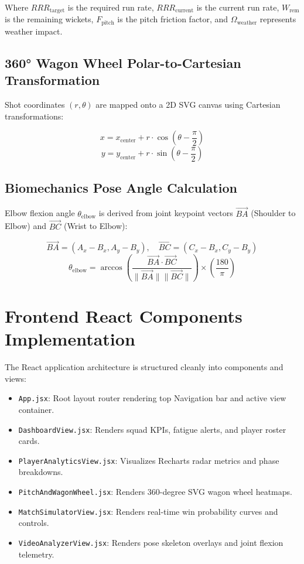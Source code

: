 \documentclass[12pt,a4paper]{report}
\begin{document}
Where $RRR_{\text{target}}$ is the required run rate, $RRR_{\text{current}}$ is the current run rate, $W_{\text{rem}}$ is the remaining wickets, $F_{\text{pitch}}$ is the pitch friction factor, and $\Omega_{\text{weather}}$ represents weather impact.

\subsection{360° Wagon Wheel Polar-to-Cartesian Transformation}
Shot coordinates $(r, \theta)$ are mapped onto a 2D SVG canvas using Cartesian transformations:

\begin{equation}
x = x_{\text{center}} + r \cdot \cos\left(\theta - \frac{\pi}{2}\right)
\end{equation}
\begin{equation}
y = y_{\text{center}} + r \cdot \sin\left(\theta - \frac{\pi}{2}\right)
\end{equation}

\subsection{Biomechanics Pose Angle Calculation}
Elbow flexion angle $\theta_{\text{elbow}}$ is derived from joint keypoint vectors $\vec{BA}$ (Shoulder to Elbow) and $\vec{BC}$ (Wrist to Elbow):

\begin{equation}
\vec{BA} = (A_x - B_x, A_y - B_y), \quad \vec{BC} = (C_x - B_x, C_y - B_y)
\end{equation}
\begin{equation}
\theta_{\text{elbow}} = \arccos\left( \frac{\vec{BA} \cdot \vec{BC}}{\|\vec{BA}\| \|\vec{BC}\|} \right) \times \left(\frac{180}{\pi}\right)
\end{equation}

\section{Frontend React Components Implementation}
The React application architecture is structured cleanly into components and views:
\begin{itemize}
    \item \texttt{App.jsx}: Root layout router rendering top Navigation bar and active view container.
    \item \texttt{DashboardView.jsx}: Renders squad KPIs, fatigue alerts, and player roster cards.
    \item \texttt{PlayerAnalyticsView.jsx}: Visualizes Recharts radar metrics and phase breakdowns.
    \item \texttt{PitchAndWagonWheel.jsx}: Renders 360-degree SVG wagon wheel heatmaps.
    \item \texttt{MatchSimulatorView.jsx}: Renders real-time win probability curves and controls.
    \item \texttt{VideoAnalyzerView.jsx}: Renders pose skeleton overlays and joint flexion telemetry.
\end{itemize}
\end{document}
